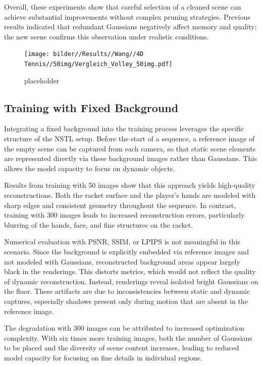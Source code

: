 Overall, these experiments show that careful selection of a cleaned scene can achieve substantial improvements without complex pruning strategies. 
Previous results indicated that redundant Gaussians negatively affect memory and quality; the new scene confirms this observation under realistic conditions.

\begin{figure}
    \centering
    \texttt{[image: bilder//Results//Wang//4D Tennis//50img/Vergleich\_Volley\_50img.pdf]}
    \caption{placeholder}
    \label{fig:4DTennis50img_GtvsRender}
\end{figure}

\subsection{Training with Fixed Background}

Integrating a fixed background into the training process leverages the specific structure of the NSTL setup. 
Before the start of a sequence, a reference image of the empty scene can be captured from each camera, so that static scene elements are represented directly via these background images rather than Gaussians. 
This allows the model capacity to focus on dynamic objects.

Results from training with 50 images show that this approach yields high-quality reconstructions. 
Both the racket surface and the player’s hands are modeled with sharp edges and consistent geometry throughout the sequence. 
In contrast, training with 300 images leads to increased reconstruction errors, particularly blurring of the hands, face, and fine structures on the racket.

Numerical evaluation with PSNR, SSIM, or LPIPS is not meaningful in this scenario. 
Since the background is explicitly embedded via reference images and not modeled with Gaussians, reconstructed background areas appear largely black in the renderings. 
This distorts metrics, which would not reflect the quality of dynamic reconstruction. 
Instead, renderings reveal isolated bright Gaussians on the floor. 
These artifacts are due to inconsistencies between static and dynamic captures, especially shadows present only during motion that are absent in the reference image.

The degradation with 300 images can be attributed to increased optimization complexity. 
With six times more training images, both the number of Gaussians to be placed and the diversity of scene content increases, leading to reduced model capacity for focusing on fine details in individual regions.











